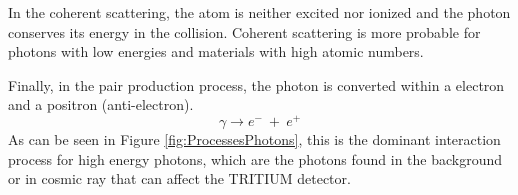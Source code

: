In the coherent scattering, the atom is neither excited nor ionized and the photon conserves its energy in the collision. Coherent scattering is more probable for photons with low energies and materials with high atomic numbers. %

Finally, in the pair production process, the photon is converted within a electron and a positron (anti-electron). 
\begin{equation}
\gamma \longrightarrow e^- ~ + ~ e^+
\label{eq:pairproductionprocess}
\end{equation}
As can be seen in Figure \ref{fig:ProcessesPhotons}, this is the dominant interaction process for high energy photons, which are the photons found in the background or in cosmic ray that can affect the TRITIUM detector.


